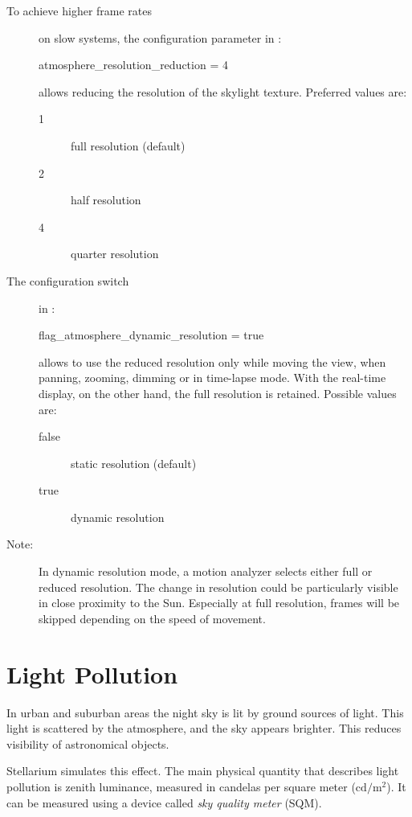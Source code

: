 \begin{description}
\item[To achieve higher frame rates] on slow systems,
the configuration parameter in :
\begin{configfile}
[landscape]
atmosphere_resolution_reduction = 4
\end{configfile}
allows reducing the resolution of the skylight texture.
Preferred values are:
\begin{description}
\item[1] full resolution (default)
\item[2] half resolution
\item[4] quarter resolution
\end{description}
\item[The configuration switch] in :
\begin{configfile}
[landscape]
flag_atmosphere_dynamic_resolution = true
\end{configfile}
allows to use the reduced resolution only while moving the view, when panning, 
zooming, dimming or in time-lapse mode. With the real-time display, on the other hand, 
the full resolution is retained.
Possible values are:
\begin{description}
\item[false] static resolution (default)
\item[true] dynamic resolution
\end{description}
\item[Note:]
In dynamic resolution mode, a motion analyzer selects either full or reduced resolution.
The change in resolution could be particularly visible in close proximity to the Sun.
Especially at full resolution, frames will be skipped depending on the speed of movement.
\end{description}

\section{Light Pollution}

In urban and suburban areas the night sky is lit by ground sources of light.
This light is scattered by the atmosphere, and the sky appears brighter. This
reduces visibility of astronomical objects.

Stellarium simulates this effect. The main physical quantity that describes light pollution is zenith luminance, measured in candelas per square meter ($\mathrm{cd/m^2}$). It can be measured using a device called \emph{sky quality meter} (SQM).

